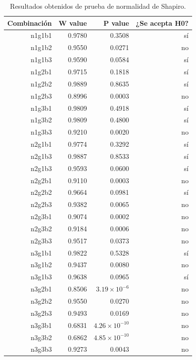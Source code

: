 \documentclass{article}
\begin{document}
\begin{table}[ht]
    \centering
    \caption{Resultados obtenidos de prueba de normalidad de Shapiro.} 
    \begin{tabular}{|r|r|r|r|}
    \hline
    Combinaci\'on & W value & P value & ¿Se acepta H0?  \\
    \hline
    n1g1b1 & 0.9780 & 0.3508 & s\'i \\
    \hline 
    n1g1b2 & 0.9550 & 0.0271 & no  \\
    \hline 
    n1g1b3 & 0.9590 & 0.0584 & s\'i \\
    \hline
    n1g2b1 & 0.9715 & 0.1818 & s\'i \\
    \hline
    n1g2b2 & 0.9889 & 0.8635 & s\'i \\
    \hline
    n1g2b3 & 0.8996 & 0.0003 & no \\
    \hline
    n1g3b1 & 0.9809 & 0.4918 & s\'i \\
    \hline
    n1g3b2 & 0.9809 & 0.4800 & s\'i \\
    \hline
    n1g3b3 & 0.9210 & 0.0020 & no \\
    \hline
    n2g1b1 & 0.9774 & 0.3292 & s\'i \\
    \hline
    n2g1b3 & 0.9887 & 0.8533 & s\'i \\
    \hline
    n2g1b3 & 0.9593 & 0.0600 & s\'i \\
    \hline
    n2g2b1 & 0.9110 & 0.0003 & no \\
    \hline
    n2g2b2 & 0.9664 & 0.0981 & s\'i \\
    \hline
    n2g2b3 & 0.9382 & 0.0065 & no \\
    \hline
    n2g3b1 & 0.9074 & 0.0002 & no \\
    \hline
    n2g3b2 & 0.9184 & 0.0006 & no \\
    \hline
    n2g3b3 & 0.9517 & 0.0373 & no \\
    \hline
    n3g1b1 & 0.9822 & 0.5328 & s\'i \\
    \hline
    n3g1b2 & 0.9437 & 0.0080 & no \\
    \hline
    n3g1b3 & 0.9638 & 0.0965 & s\'i \\
    \hline
    n3g2b1 & 0.8506 & $3.19\times 10^{-6}$ & no \\
    \hline
    n3g2b2 & 0.9550 & 0.0270 & no \\
    \hline
    n3g2b3 & 0.9493 & 0.0169 & no \\
    \hline
    n3g3b1 & 0.6831 & $4.26\times 10^{-10}$ & no \\
    \hline
    n3g3b2 & 0.6862 & $4.85\times 10^{-10}$ & no \\
    \hline
    n3g3b3 & 0.9273 & 0.0043 & no \\
    \hline
\end{tabular}
    \label{cuadro 2}
\end{table}
\end{document}
